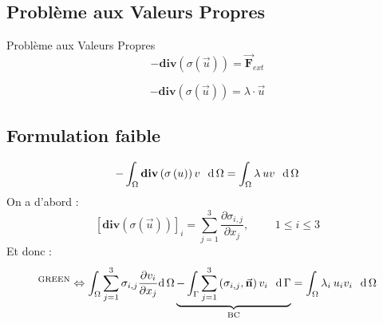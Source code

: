 \documentclass[french]{beamer}
\begin{document}
\subsection{Problème aux Valeurs Propres} 
\begin{frame}{Problème aux Valeurs Propres} 
  \begin{equation*}
    - \mathbf{div}  \left( \sigma \left(\vec{u}\right) \right) = \vec{\mathbf{F}}_{ext}
  \end{equation*}

  \begin{equation}
   - \mathbf{div}  \left( \sigma \left(\vec{u}\right) \right) = \lambda \cdot \vec{u}
  \end{equation}
\end{frame}

\subsection{Formulation faible}
\begin{frame}
  \begin{equation}
    - \int_\Omega \mathbf{div}  \left( \sigma \left(u\right) \right) v \hspace{7pt} \mathop{\!\mathrm{d}} \Omega 
    = \int_\Omega \lambda \hspace{2pt} u v \hspace{7pt} \mathop{\!\mathrm{d}} \Omega
  \end{equation}
  \pause
  On a d'abord :
  \begin{equation*}
    \left[\mathbf{div}  \left( \sigma \left(\vec{u}\right) \right)\right]_i = 
    \sum_{j=1}^3 \frac{\partial\sigma_{i,j}}{\partial x_j}, \hspace{28pt}  \boxed{1 \leq i \leq 3}
      \end{equation*}
  \pause
  \vspace{10pt}
  Et donc : 
  \begin{equation}
    ^{\mathrm{GREEN}}\Leftrightarrow
      \int_\Omega \sum_{j=1}^3 \sigma_{i,j} \frac{\partial v_i}{\partial x_j} \mathop{\!\mathrm{d}} \Omega 
      \underbrace{- \int_\Gamma \sum_{j=1}^3 \left(\sigma_{i,j}, \vec{\mathbf{n}} \right) v_i \hspace{7pt} 
       \mathop{\!\mathrm{d}} \Gamma}_{\mathrm{BC}}
    = \int_\Omega \lambda_i \hspace{2pt} u_i v_i \hspace{7pt} \mathop{\!\mathrm{d}} \Omega
  \end{equation}
  \end{frame}
\end{document}
